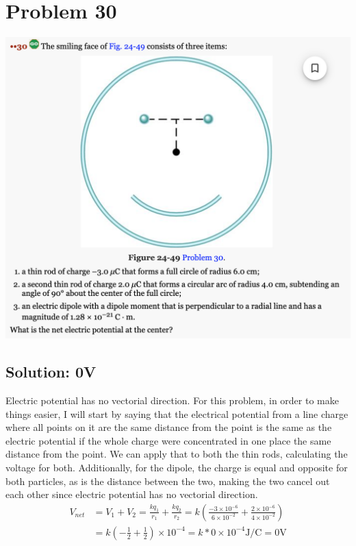 \documentclass[12pt]{article}
\begin{document}
\section{Problem 30}
\includegraphics[width=\textwidth]{picture_10.png}

\subsection*{Solution: 0V}
Electric potential has no vectorial direction. 
For this problem, in order to make things easier, I will start by 
saying that the electrical potential from a line charge where all points on it are the same distance from the point is the same as the electric potential if the whole charge were concentrated in one place the same distance from the point.
We can apply that to both the thin rods, calculating the voltage for both.
Additionally, for the dipole, the charge is equal and opposite for both particles, as is the distance between the two, making the two cancel out each other since electric potential has no vectorial direction.
\begin{align*}
    V_{net} &=  V_1 + V_2
        =   \frac{kq_1}{r_1} + \frac{kq_2}{r_2}
        =   k\left(\frac{-3 \times 10^{-6}}{6 \times 10^{-2}} + \frac{2 \times 10^{-6}}{4 \times 10^{-2}}\right)\\
        &=  k\left( -\frac{1}{2} + \frac{1}{2} \right) \times 10^{-4}
        =   k * 0 \times 10^{-4} \unit{\joule/\coulomb}
        =   \boxed{0 \unit{\volt}}
\end{align*}
\end{document}
